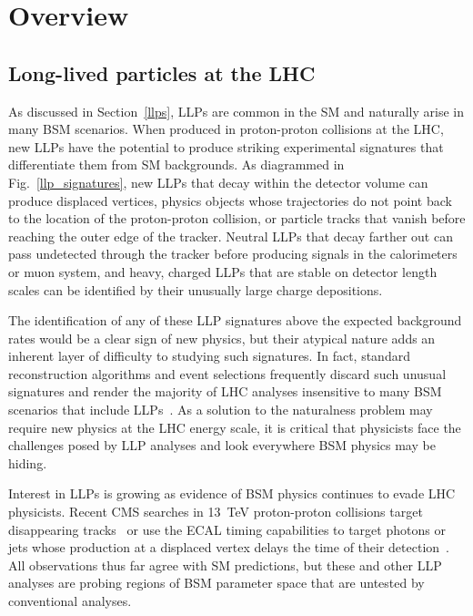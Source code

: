 \section{Overview}
\label{overview}
\subsection{Long-lived particles at the LHC}
As discussed in Section~\ref{llps}, LLPs are common in the SM and naturally arise in many BSM scenarios. When produced in proton-proton collisions at the LHC, new LLPs have the potential to produce striking experimental signatures that differentiate them from SM backgrounds. As diagrammed in Fig.~\ref{llp_signatures}, new LLPs that decay within the detector volume can produce displaced vertices, physics objects whose trajectories do not point back to the location of the proton-proton collision, or particle tracks that vanish before reaching the outer edge of the tracker. Neutral LLPs that decay farther out can pass undetected through the tracker before producing signals in the calorimeters or muon system, and heavy, charged LLPs that are stable on detector length scales can be identified by their unusually large charge depositions.



The identification of any of these LLP signatures above the expected background rates would be a clear sign of new physics, but their atypical nature adds an inherent layer of difficulty to studying such signatures. In fact, standard reconstruction algorithms and event selections frequently discard such unusual signatures and render the majority of LHC analyses insensitive to many BSM scenarios that include LLPs~\cite{llp_whitepaper}. As a solution to the naturalness problem may require new physics at the LHC energy scale, it is critical that physicists face the challenges posed by LLP analyses and look everywhere BSM physics may be hiding.

Interest in LLPs is growing as evidence of BSM physics continues to evade LHC physicists. Recent CMS searches in \SI{13}{\TeV} proton-proton collisions target disappearing tracks~\cite{disappearing_tracks} or use the ECAL timing capabilities to target photons or jets whose production at a displaced vertex delays the time of their detection~\cite{delayed_photons, delayed_jets}. All observations thus far agree with SM predictions, but these and other LLP analyses are probing regions of BSM parameter space that are untested by conventional analyses.

